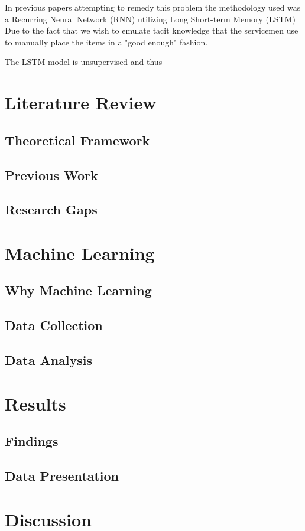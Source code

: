 \documentclass[12pt,a4paper]{report}
\begin{document}
In previous papers attempting to remedy this problem the methodology used was a Recurring Neural Network (RNN) utilizing Long Short-term Memory (LSTM) \cite{ref2} Due to the fact that we wish to emulate tacit knowledge that the servicemen use to manually place the items in a "good enough" fashion.

The LSTM model is unsupervised and thus

\chapter{Literature Review}
\section{Theoretical Framework}
\section{Previous Work}
\section{Research Gaps}

\chapter{Machine Learning}
\section{Why Machine Learning}
\section{Data Collection}
\section{Data Analysis}

\chapter{Results}
\section{Findings}
\section{Data Presentation}

\chapter{Discussion}
\end{document}
